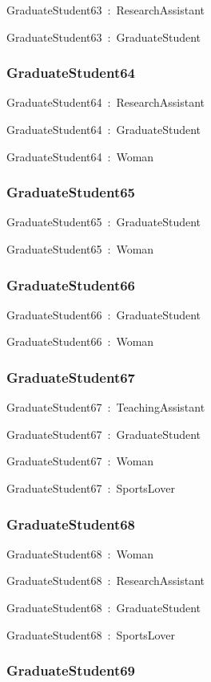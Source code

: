 \documentclass{article}
\begin{document}
GraduateStudent63~:~ResearchAssistant

GraduateStudent63~:~GraduateStudent

\subsubsection*{GraduateStudent64}

GraduateStudent64~:~ResearchAssistant

GraduateStudent64~:~GraduateStudent

GraduateStudent64~:~Woman

\subsubsection*{GraduateStudent65}

GraduateStudent65~:~GraduateStudent

GraduateStudent65~:~Woman

\subsubsection*{GraduateStudent66}

GraduateStudent66~:~GraduateStudent

GraduateStudent66~:~Woman

\subsubsection*{GraduateStudent67}

GraduateStudent67~:~TeachingAssistant

GraduateStudent67~:~GraduateStudent

GraduateStudent67~:~Woman

GraduateStudent67~:~SportsLover

\subsubsection*{GraduateStudent68}

GraduateStudent68~:~Woman

GraduateStudent68~:~ResearchAssistant

GraduateStudent68~:~GraduateStudent

GraduateStudent68~:~SportsLover

\subsubsection*{GraduateStudent69}
\end{document}
